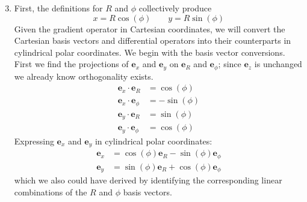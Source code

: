 \documentclass[a4paper]{article}
\begin{document}
\begin{enumerate}[label=(\alph*)]
	\setcounter{enumi}{2}
	\item First, the definitions for \( R \) and \( \phi \) collectively produce
	\[
		x = R \cos\!\left(\phi\right) \qquad y = R \sin\!\left(\phi\right) 
	\]
	Given the gradient operator in Cartesian coordinates, we will convert the Cartesian basis vectors and differential operators into their counterparts in cylindrical polar coordinates. We begin with the basis vector conversions. First we find the projections of \( \pmb{e}_{x} \) and \( \pmb{e}_{y} \) on \( \pmb{e}_{R} \) and \( \pmb{e}_{\phi} \); since \( \pmb{e}_{z} \) is unchanged we already know orthogonality exists.
	\begin{align*}
		\pmb{e}_{x} \cdot \pmb{e}_{R} & = \cos\!\left(\phi\right) \\
		\pmb{e}_{x} \cdot \pmb{e}_{\phi} & = -\sin\!\left(\phi\right) \\ 
		\pmb{e}_{y} \cdot \pmb{e}_{R} & = \sin\!\left(\phi\right) \\
		\pmb{e}_{y} \cdot \pmb{e}_{\phi} & = \cos\!\left(\phi\right)
	\end{align*}
	Expressing \( \pmb{e}_{x} \) and \( \pmb{e}_{y} \) in cylindrical polar coordinates:
	\begin{align*}
		\pmb{e}_{x} & = \cos\!\left(\phi\right)\pmb{e}_{R} - \sin\!\left(\phi\right)\pmb{e}_{\phi} \\
		\pmb{e}_{y} & = \sin\!\left(\phi\right)\pmb{e}_{R} + \cos\!\left(\phi\right)\pmb{e}_{\phi}
	\end{align*}
	which we also could have derived by identifying the corresponding linear combinations of the \( R \) and \( \phi \) basis vectors. 


\end{enumerate}
\end{document}

